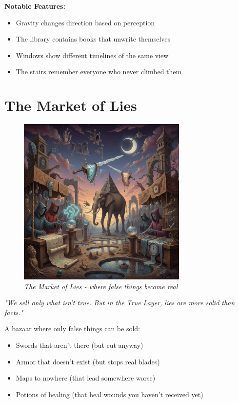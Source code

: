 \documentclass[11pt,a4paper,twoside]{book}
\begin{document}
\textbf{Notable Features:}
\begin{itemize}
    \item Gravity changes direction based on perception
    \item The library contains books that unwrite themselves
    \item Windows show different timelines of the same view
    \item The stairs remember everyone who never climbed them
\end{itemize}

\section{The Market of Lies}

\begin{figure}[h]
\centering
\includegraphics[width=0.75\textwidth]{images/market_of_lies_2025-09-03T22-31-26-965Z_1.png}
\caption*{\textit{The Market of Lies - where false things become real}}
\end{figure}

\begin{tcolorbox}[codexbox={Merchant's Warning}]
\textit{"We sell only what isn't true. But in the True Layer, lies are more solid than facts."}
\end{tcolorbox}

A bazaar where only false things can be sold:
\begin{itemize}
    \item Swords that aren't there (but cut anyway)
    \item Armor that doesn't exist (but stops real blades)  
    \item Maps to nowhere (that lead somewhere worse)
    \item Potions of healing (that heal wounds you haven't received yet)
\end{itemize}
\end{document}
